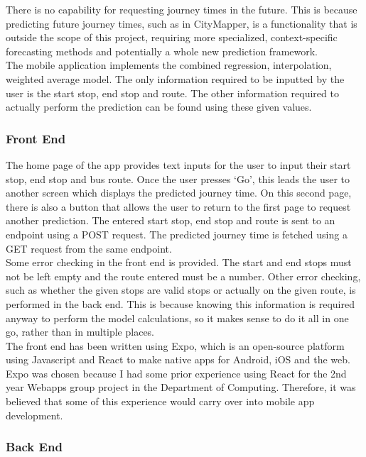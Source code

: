 There is no capability for requesting journey times in the future. This is because predicting future journey times, such as in CityMapper, is a functionality that is outside the scope of this project, requiring more specialized, context-specific forecasting methods and potentially a whole new prediction framework. \\

The mobile application implements the combined regression, interpolation, weighted average model. The only information required to be inputted by the user is the start stop, end stop and route. The other information required to actually perform the prediction can be found using these given values.

\subsubsection{Front End}

The home page of the app provides text inputs for the user to input their start stop, end stop and bus route. Once the user presses `Go', this leads the user to another screen which displays the predicted journey time. On this second page, there is also a button that allows the user to return to the first page to request another prediction. The entered start stop, end stop and route is sent to an endpoint using a POST request. The predicted journey time is fetched using a GET request from the same endpoint. \\

Some error checking in the front end is provided. The start and end stops must not be left empty and the route entered must be a number. Other error checking, such as whether the given stops are valid stops or actually on the given route, is performed in the back end. This is because knowing this information is required anyway to perform the model calculations, so it makes sense to do it all in one go, rather than in multiple places. \\

The front end has been written using Expo, which is an open-source platform using Javascript and React to make native apps for Android, iOS and the web. Expo was chosen because I had some prior experience using React for the 2nd year Webapps group project in the Department of Computing. Therefore, it was believed that some of this experience would carry over into mobile app development.

\subsubsection{Back End}

